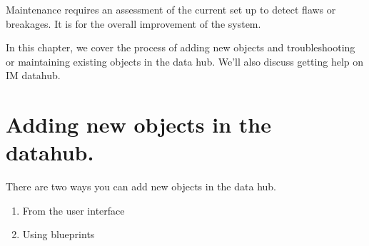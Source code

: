 \documentclass[]{book}
\providecommand{\tightlist}{%
  \setlength{\itemsep}{0pt}\setlength{\parskip}{0pt}}
\begin{document}
Maintenance requires an assessment of the current set up to detect flaws or breakages. It is for the overall improvement of the system.

In this chapter, we cover the process of adding new objects and troubleshooting or maintaining existing objects in the data hub. We'll also discuss getting help on IM datahub.

\hypertarget{adding-new-objects-in-the-datahub.}{%
\section{Adding new objects in the datahub.}\label{adding-new-objects-in-the-datahub.}}

There are two ways you can add new objects in the data hub.

\begin{enumerate}
\def\labelenumi{\arabic{enumi}.}
\tightlist
\item
  From the user interface
\item
  Using blueprints
\end{enumerate}


\end{document}

